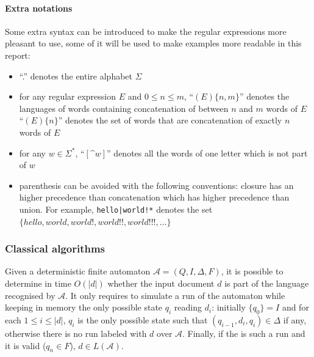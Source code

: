 \documentclass[12px]{article}
\theoremstyle{definition}
\begin{document}
        \paragraph{Extra notations}
          Some extra syntax can be introduced to make the
          regular expressions more pleasant to use, some of it will be used to
          make examples more readable in this report:
            \begin{itemize}
              \item ``.'' denotes the entire alphabet $\Sigma$
              \item for any regular expression $E$ and $0 \leq n \leq m$,
                ``$(E)\{n,m\}$'' denotes the languages of words containing
                concatenation of between $n$ and $m$ words of $E$
                ``$(E)\{n\}$'' denotes the set of words that are concatenation
                of exactly $n$ words of $E$
              \item for any $w \in \Sigma^*$,
                ``$[\texttt{\textasciicircum}w]$'' denotes all the words of one
                letter which is not part of $w$
              \item parenthesis can be avoided with the following conventions:
                closure has an higher precedence than concatenation which has
                higher precedence than union. For example,
                \texttt{hello|world!*} denotes the set $\{hello, world, world!,
                world!!, world!!!, \ldots\}$
            \end{itemize}

      \subsubsection{Classical algorithms}

        Given a deterministic finite automaton $\mathcal{A} = (Q, I, \Delta,
        F)$, it is possible to determine in time $O(|d|)$ whether the input
        document $d$ is part of the language recognised by $\mathcal{A}$. It
        only requires to simulate a run of the automaton while keeping in
        memory the only possible state $q_i$ reading $d_i$: initially $\{q_0\}
        = I$ and for each $1 \leq i \leq |d|$, $q_{i}$ is the only possible
        state such that $(q_{i-1}, d_i, q_i) \in \Delta$ if any, otherwise
        there is no run labeled with $d$ over $\mathcal{A}$. Finally, if the is
        such a run and it is valid ($q_n \in F$), $d \in L(\mathcal{A})$.
\end{document}

